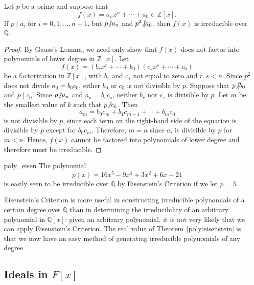 \begin{theorem}\label{poly:eisenstein}
Let $p$ be a prime and suppose that
\[
f(x) = a_n x^n + \cdots + a_0 \in {\mathbb Z}[x].
\]
If $p \mid a_i$ for $i = 0, 1, \ldots, n-1$, but $p {\not{\mid}} a_n$
and $p^2 {\not{\mid}} a_0$, then $f(x)$ is irreducible over ${\mathbb Q}$. 
\end{theorem}
 
 
\begin{proof}
By Gauss's Lemma, we need only show that $f(x)$ does not factor into
polynomials of lower degree in ${\mathbb Z}[x]$. Let  
\[
f(x) = (b_rx^r + \cdots + b_0)(c_s x^s + \cdots + c_0 )
\]
be a factorization in ${\mathbb Z}[x]$, with $b_r$ and $c_s$ not equal to
zero and $r, s < n$. Since $p^2$ does not divide $a_0 = b_0 c_0$,
either $b_0$ or $c_0$ is not divisible by $p$. Suppose that $p {\not{\mid}}
b_0$ and $p \mid c_0$. Since $p {\not{\mid}} a_n$ and $a_n = b_r c_s$,
neither $b_r$ nor $c_s$ is divisible by $p$. Let $m$ be the smallest
value of $k$ such that $p {\not{\mid}} c_k$. Then  
\[
a_m = b_0 c_m + b_1 c_{m-1} + \cdots + b_m c_0
\]
is not divisible by $p$, since each term on the right-hand side of the
equation is divisible by $p$ except for $b_0 c_m$.  Therefore, $m =n$
since $a_i$ is divisible by $p$ for $m < n$.  Hence, $f(x)$ cannot be
factored into polynomials of lower degree and therefore must be
irreducible. 
\end{proof}
 
 
\begin{example}{poly_eisen}
The polynomial
\[
p(x) = 16 x^5  -9 x^4 + 3x^2 + 6 x - 21
\]
is easily seen to be irreducible over ${\mathbb Q}$ by Eisenstein's
Criterion if we let $p = 3$.
\end{example}
 
 
\medskip
 
 
Eisenstein's Criterion is more useful in constructing irreducible
polynomials of a certain degree over ${\mathbb Q}$ than in determining the
irreducibility of an arbitrary polynomial in ${\mathbb Q}[x]$: given an
arbitrary polynomial, it is not very likely that we can apply
Eisenstein's Criterion.  The real value of Theorem~\ref{poly:eisenstein} is that we now
have an easy method of generating irreducible polynomials of any
degree. 
 
 
 
\subsection*{Ideals in $F[x]$}
 
